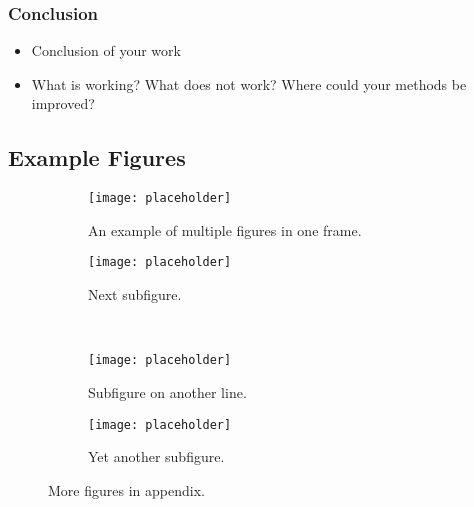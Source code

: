 \appendix
\subsubsection*{Conclusion}
\begin{itemize}
    \item Conclusion of your work
    \item What is working? What does not work? Where could your methods be improved?
\end{itemize}

\subsection*{Example Figures}

\begin{figure}[ht]
    \centering
    \begin{subfigure}[t]{0.4\textwidth}
        \centering\texttt{[image: placeholder]}
        \caption{An example of multiple figures in one frame.}
        \label{fig:multiple:example11}
    \end{subfigure}
    \begin{subfigure}[t]{0.4\textwidth}
        \centering\texttt{[image: placeholder]}
        \caption{Next subfigure.}
        \label{fig:multiple:example12}
    \end{subfigure}
    \\
    \begin{subfigure}[t]{0.4\textwidth}
        \centering\texttt{[image: placeholder]}
        \caption{Subfigure on another line.}
        \label{fig:multiple:example21}
    \end{subfigure}
    \begin{subfigure}[t]{0.4\textwidth}
        \centering\texttt{[image: placeholder]}
        \caption{Yet another subfigure.}
        \label{fig:multiple:example22}
    \end{subfigure}
    \caption{More figures in appendix.}
    \label{fig:multiple}
\end{figure}
